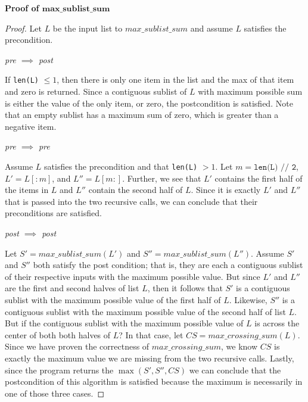     \textbf{Proof of $\textbf{max\_sublist\_sum}$}
    \begin{proof}
    
    Let $L$ be the input list to $max\_sublist\_sum$ and assume
    $L$ satisfies the precondition.
    
    \base 
    \emph{pre $\implies$ post}
    
    If \texttt{len(L)} $\leqslant 1$, then there is only one item
    in the list and the max of that item and zero is returned. 
    Since a contiguous sublist of $L$ with maximum possible
    sum is either the value of the only item, or zero, the 
    postcondition is satisfied. Note that an empty sublist
    has a maximum sum of zero, which is greater than a 
    negative item.
    
    \vspace{5mm}
    
    \istep
    
    \emph{pre $\implies$ pre}
    
    Assume $L$ satisfies the precondition and that \texttt{len(L)}
    $> 1$. Let $m = \texttt{len(L) // 2}$, $L' = L[:m]$, and 
    $L'' = L[m:]$.
    Further, we see that $L'$ contains the first half
    of the items in $L$ and $L''$ contain the second half of $L$.
    Since it is exactly $L'$ and $L''$ that is passed into the two
    recursive calls, we can conclude that their preconditions
    are satisfied.
    
    \emph{post $\implies$ post}
    
    Let $S' = max\_sublist\_sum(L')$ and $S'' = max\_sublist\_sum(L'')$.
    Assume $S'$ and $S''$ both satisfy the post condition; that is,
    they are each a contiguous sublist of their respective inputs 
    with the maximum possible value. But since $L'$ and $L''$ are
    the first and second halves of list $L$, then it follows that
    $S'$ is a contiguous sublist with the maximum possible value
    of the first half of $L$. Likewise, $S''$ is a contiguous 
    sublist with the maximum possible value of the second half of
    list $L$. But if the contiguous sublist with the maximum 
    possible value of $L$ is across the center of both both halves
    of $L$? In that case, let $CS = max\_crossing\_sum(L)$. Since
    we have proven the correctness of $max\_crossing\_sum$, we
    know $CS$ is exactly the maximum value we are missing from
    the two recursive calls. Lastly, since the program returns
    the $\max{(S', S'', CS)}$ we can conclude that the 
    postcondition of this algorithm is satisfied because the 
    maximum is necessarily in one of those three cases.
    

\end{proof}
